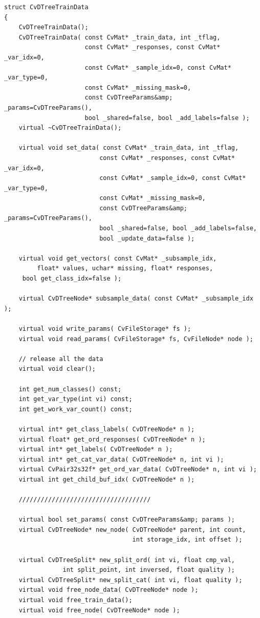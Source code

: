 \begin{lstlisting}
struct CvDTreeTrainData
{
    CvDTreeTrainData();
    CvDTreeTrainData( const CvMat* _train_data, int _tflag,
                      const CvMat* _responses, const CvMat* _var_idx=0,
                      const CvMat* _sample_idx=0, const CvMat* _var_type=0,
                      const CvMat* _missing_mask=0,
                      const CvDTreeParams&amp; _params=CvDTreeParams(),
                      bool _shared=false, bool _add_labels=false );
    virtual ~CvDTreeTrainData();

    virtual void set_data( const CvMat* _train_data, int _tflag,
                          const CvMat* _responses, const CvMat* _var_idx=0,
                          const CvMat* _sample_idx=0, const CvMat* _var_type=0,
                          const CvMat* _missing_mask=0,
                          const CvDTreeParams&amp; _params=CvDTreeParams(),
                          bool _shared=false, bool _add_labels=false,
                          bool _update_data=false );

    virtual void get_vectors( const CvMat* _subsample_idx,
         float* values, uchar* missing, float* responses, 
	 bool get_class_idx=false );

    virtual CvDTreeNode* subsample_data( const CvMat* _subsample_idx );

    virtual void write_params( CvFileStorage* fs );
    virtual void read_params( CvFileStorage* fs, CvFileNode* node );

    // release all the data
    virtual void clear();

    int get_num_classes() const;
    int get_var_type(int vi) const;
    int get_work_var_count() const;

    virtual int* get_class_labels( CvDTreeNode* n );
    virtual float* get_ord_responses( CvDTreeNode* n );
    virtual int* get_labels( CvDTreeNode* n );
    virtual int* get_cat_var_data( CvDTreeNode* n, int vi );
    virtual CvPair32s32f* get_ord_var_data( CvDTreeNode* n, int vi );
    virtual int get_child_buf_idx( CvDTreeNode* n );

    ////////////////////////////////////

    virtual bool set_params( const CvDTreeParams&amp; params );
    virtual CvDTreeNode* new_node( CvDTreeNode* parent, int count,
                                   int storage_idx, int offset );

    virtual CvDTreeSplit* new_split_ord( int vi, float cmp_val,
                int split_point, int inversed, float quality );
    virtual CvDTreeSplit* new_split_cat( int vi, float quality );
    virtual void free_node_data( CvDTreeNode* node );
    virtual void free_train_data();
    virtual void free_node( CvDTreeNode* node );


\end{lstlisting}
